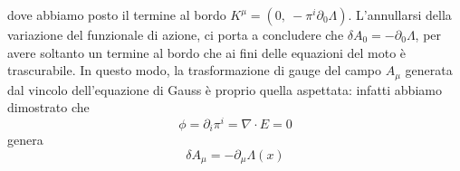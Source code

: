     dove abbiamo posto il termine al bordo $K^\mu = (0, ~- \pi^i \partial_0 \Lambda)$. L'annullarsi della variazione del funzionale di azione, ci porta a concludere che $\delta A_0 = - \partial_0 \Lambda$, per avere soltanto un termine al bordo che ai fini delle equazioni del moto è trascurabile. In questo modo, la trasformazione di gauge del campo $A_\mu$ generata dal vincolo dell'equazione di Gauss è proprio quella aspettata: infatti abbiamo dimostrato che
\begin{equation*}
    \phi = \partial_i \pi^i = \nabla \cdot E = 0
\end{equation*}
    genera 
\begin{equation*}
    \delta A_\mu = - \partial_\mu \Lambda(x)
\end{equation*}
